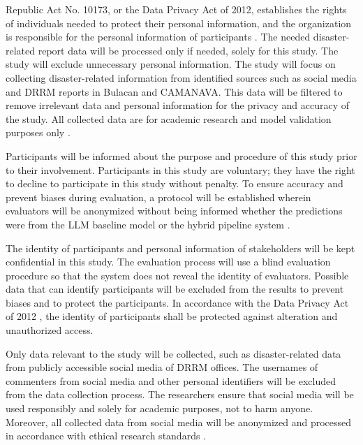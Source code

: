 \documentclass[12pt,a4paper]{report}
\begin{document}
\begin{description}[style=nextline,leftmargin=0pt]
  \item[Data Privacy and Confidentiality.] Republic Act No. 10173, or the Data
  Privacy Act of 2012, establishes the rights of individuals needed to protect
  their personal information, and the organization is responsible for the
  personal information of participants \parencite{ra10173}. The needed
  disaster-related report data will be processed only if needed, solely for
  this study. The study will exclude unnecessary personal information. The
  study will focus on collecting disaster-related information from identified
  sources such as social media and DRRM reports in Bulacan and CAMANAVA. This
  data will be filtered to remove irrelevant data and personal information for
  the privacy and accuracy of the study. All collected data are for academic
  research and model validation purposes only \parencite{npc2016}.

  \item[Voluntary Participation and Informed Consent.] Participants will be
  informed about the purpose and procedure of this study prior to their
  involvement. Participants in this study are voluntary; they have the right to
  decline to participate in this study without penalty. To ensure accuracy and
  prevent biases during evaluation, a protocol will be established wherein
  evaluators will be anonymized without being informed whether the predictions
  were from the LLM baseline model or the hybrid pipeline system
  \parencite{belmont1979}.

  \item[Confidentiality of Participants.] The identity of participants and
  personal information of stakeholders will be kept confidential in this study.
  The evaluation process will use a blind evaluation procedure so that the
  system does not reveal the identity of evaluators. Possible data that can
  identify participants will be excluded from the results to prevent biases and
  to protect the participants. In accordance with the Data Privacy Act of 2012
  \parencite{ra10173, npc2016}, the identity of participants shall be protected
  against alteration and unauthorized access.

  \item[Responsible Use of Social Media Data.] Only data relevant to the study
  will be collected, such as disaster-related data from publicly accessible
  social media of DRRM offices. The usernames of commenters from social media
  and other personal identifiers will be excluded from the data collection
  process. The researchers ensure that social media will be used responsibly
  and solely for academic purposes, not to harm anyone. Moreover, all collected
  data from social media will be anonymized and processed in accordance with
  ethical research standards \parencite{npc2016}.


\end{description}
\end{document}
